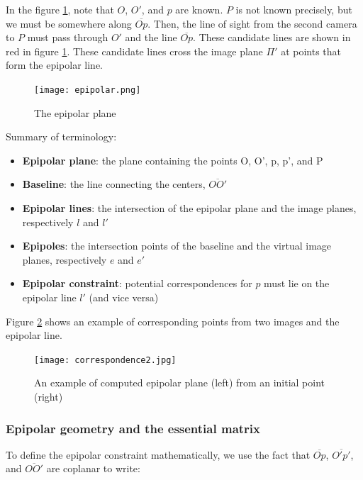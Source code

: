 \documentclass[twoside]{article}
\begin{document}
In the figure \ref{epi}, note that $O$, $O'$, and $p$ are known. $P$ is not known precisely, but we must be somewhere along $\overline{Op}$. Then, the line of sight from the second camera to $P$ must pass through $O'$ and the line $\overline{Op}$. These candidate lines are shown in red in figure \ref{epi}. These candidate lines cross the image plane $\Pi'$ at points that form the epipolar line.

\begin{figure}[h!]
  \begin{center}
	\texttt{[image: epipolar.png]}
  \end{center}
  \caption{The epipolar plane}
  \label{epi}
\end{figure}

Summary of terminology:
\begin{itemize}
\item \textbf{Epipolar plane}: the plane containing the points O, O', p, p', and P
\item \textbf{Baseline}: the line connecting the centers, $\overline{OO'}$
\item \textbf{Epipolar lines}: the intersection of the epipolar plane and the image planes, respectively $l$ and $l'$
\item \textbf{Epipoles}: the intersection points of the baseline and the virtual image planes, respectively $e$ and $e'$
\item \textbf{Epipolar constraint}: potential correspondences for $p$ must lie on the epipolar line $l'$ (and vice versa)
\end{itemize}

Figure \ref{correspondence} shows an example of corresponding points from two images and the epipolar line.

\begin{figure}[h!]
  \begin{center}
	\texttt{[image: correspondence2.jpg]}  \end{center}
  \caption{An example of computed epipolar plane (left) from an initial point (right)}
  \label{correspondence}
\end{figure}

\subsubsection{Epipolar geometry and the essential matrix}

To define the epipolar constraint mathematically, we use the fact that $\overline{Op}$, $\overline{O'p'}$, and $\overline{OO'}$ are coplanar to write:
\end{document}
